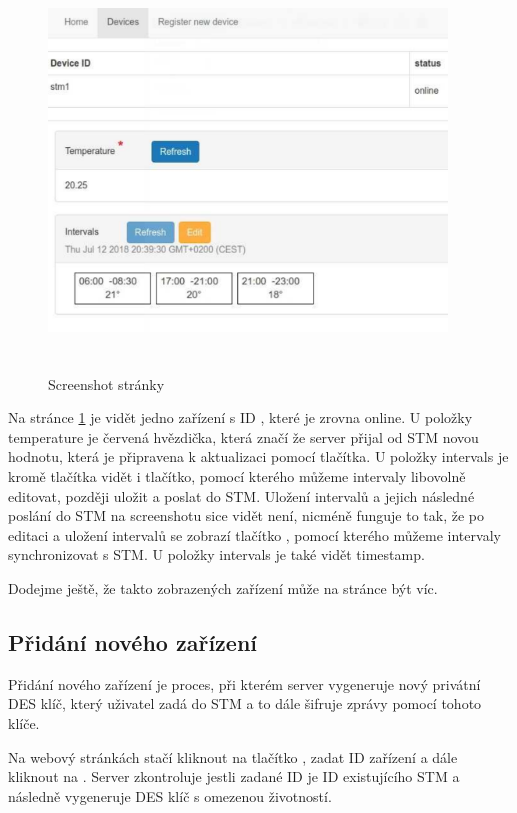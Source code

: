 \begin{figure}[tbh!]
\includegraphics[width=400px, height=400px]{../img/devices_screenshot.pdf}
\caption{Screenshot  stránky}
\label{devices-screenshot}
\end{figure}

Na stránce \ref{devices-screenshot} je vidět jedno zařízení s ID , které je zrovna online.
U položky temperature je červená hvězdička, která značí že server přijal od STM novou hodnotu, která
je připravena k aktualizaci pomocí  tlačítka.
U položky intervals je kromě  tlačítka vidět i  tlačítko, pomocí kterého můžeme intervaly
libovolně editovat, později uložit a poslat do STM.
Uložení intervalů a jejich následné poslání do STM na screenshotu sice vidět není, nicméně funguje to
tak, že po editaci a uložení intervalů se zobrazí tlačítko , pomocí kterého můžeme
intervaly synchronizovat s STM.
U položky intervals je také vidět timestamp.

Dodejme ještě, že takto zobrazených zařízení může na stránce být víc.

\subsection{Přidání nového zařízení}
Přidání nového zařízení je proces, při kterém server vygeneruje nový privátní DES klíč, který uživatel
zadá do STM a to dále šifruje zprávy pomocí tohoto klíče.

Na webový stránkách stačí kliknout na tlačítko , zadat ID zařízení a dále
kliknout na .
Server zkontroluje jestli zadané ID je ID existujícího STM a následně vygeneruje DES klíč s omezenou
životností.

